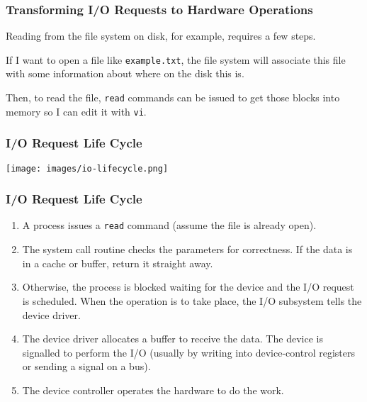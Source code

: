 \begin{frame}
\frametitle{Transforming I/O Requests to Hardware Operations}

Reading from the file system on disk, for example, requires a few steps. 

If I want to open a file like \texttt{example.txt}, the file system will associate this file with some information about where on the disk this is. 

Then, to read the file, \texttt{read} commands can be issued to get those blocks into memory so I can edit it with \texttt{vi}.

\end{frame}

\begin{frame}
\frametitle{I/O Request Life Cycle}

\begin{center}
	\texttt{[image: images/io-lifecycle.png]}
\end{center}

\end{frame}

\begin{frame}
\frametitle{I/O Request Life Cycle}

\begin{enumerate}
	\item A process issues a \texttt{read} command (assume the file is already open).
	\item The system call routine checks the parameters for correctness. If the data is in a cache or buffer, return it straight away.
	\item Otherwise, the process is blocked waiting for the device and the I/O request is scheduled. When the operation is to take place, the I/O subsystem tells the device driver.
	\item The device driver allocates a buffer to receive the data. The device is signalled to perform the I/O (usually by writing into device-control registers or sending a signal on a bus).
	\item The device controller operates the hardware to do the work.
\end{enumerate}

\end{frame}

